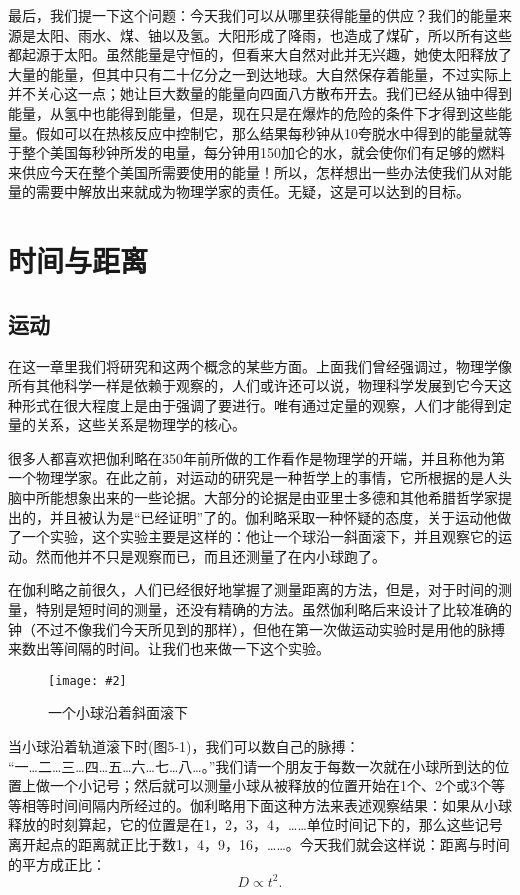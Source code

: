 \documentclass[12pt,oneside]{book}
\newenvironment{fig}[2][1]
{\begin{figure}[H]
\centering
\texttt{[image: \#2]}}
{\end{figure}}
\begin{document}
最后，我们提一下这个问题：今天我们可以从哪里获得能量的供应？我们的能量来源是太阳、雨水、煤、铀以及氢。大阳形成了降雨，也造成了煤矿，所以所有这些都起源于太阳。虽然能量是守恒的，但看来大自然对此并无兴趣，她使太阳释放了大量的能量，但其中只有二十亿分之一到达地球。大自然保存着能量，不过实际上并不关心这一点；她让巨大数量的能量向四面八方散布开去。我们已经从铀中得到能量，从氢中也能得到能量，但是，现在只是在爆炸的危险的条件下才得到这些能量。假如可以在热核反应中控制它，那么结果每秒钟从10夸脱水中得到的能量就等于整个美国每秒钟所发的电量，每分钟用150加仑的水，就会使你们有足够的燃料来供应今天在整个美国所需要使用的能量！所以，怎样想出一些办法使我们从对能量的需要中解放出来就成为物理学家的责任。无疑，这是可以达到的目标。



\chapter{时间与距离}
\section{运动}
在这一章里我们将研究和这两个概念的某些方面。上面我们曾经强调过，物理学像所有其他科学一样是依赖于观察的，人们或许还可以说，物理科学发展到它今天这种形式在很大程度上是由于强调了要进行。唯有通过定量的观察，人们才能得到定量的关系，这些关系是物理学的核心。

很多人都喜欢把伽利略在350年前所做的工作看作是物理学的开端，并且称他为第一个物理学家。在此之前，对运动的研究是一种哲学上的事情，它所根据的是人头脑中所能想象出来的一些论据。大部分的论据是由亚里士多德和其他希腊哲学家提出的，并且被认为是“已经证明”了的。伽利略采取一种怀疑的态度，关于运动他做了一个实验，这个实验主要是这样的：他让一个球沿一斜面滚下，并且观察它的运动。然而他并不只是观察而已，而且还测量了在内小球跑了。

在伽利略之前很久，人们已经很好地掌握了测量距离的方法，但是，对于时间的测量，特别是短时间的测量，还没有精确的方法。虽然伽利略后来设计了比较准确的钟（不过不像我们今天所见到的那样），但他在第一次做运动实验时是用他的脉搏来数出等间隔的时间。让我们也来做一下这个实验。
\begin{fig}{一个小球沿着斜面滚下}
\caption{一个小球沿着斜面滚下}
\label{fig:一个小球沿着斜面滚下}
\end{fig}
当小球沿着轨道滚下时(图5-1)，我们可以数自己的脉搏：\\“一…二…三…四…五…六…七…八…。”我们请一个朋友于每数一次就在小球所到达的位置上做一个小记号；然后就可以测量小球从被释放的位置开始在1个、2个或3个等等相等时间间隔内所经过的。伽利略用下面这种方法来表述观察结果：如果从小球释放的时刻算起，它的位置是在1，2，3，4，……单位时间记下的，那么这些记号离开起点的距离就正比于数1，4，9，16，……。今天我们就会这样说：距离与时间的平方成正比：
\begin{equation*}
D\propto t^2.
\end{equation*}
\end{document}
